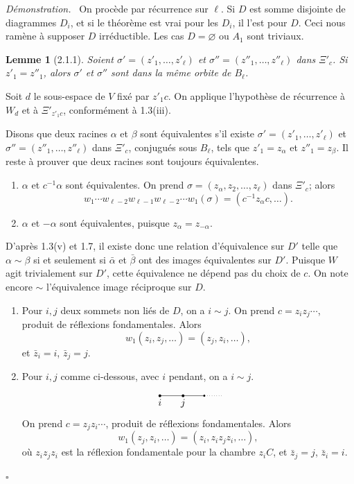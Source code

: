 \documentclass[11pt]{article}
\theoremstyle{plainfr}
\newtheorem*{lemme}{Lemme}
\newenvironment{preuve}{\par\emph{Démonstration.}\ }{\hfill$\square$\par}
\begin{document}
\begin{preuve}
On procède par récurrence sur $\ell$. Si $D$ est somme disjointe de diagrammes $D_i$, et si le théorème est vrai pour les $D_i$, il l'est pour $D$. Ceci nous ramène à supposer $D$ irréductible. Les cas $D=\varnothing$ ou $A_1$ sont triviaux.

\begin{lemme}[2.1.1]
Soient $\sigma'=(z'_1,\ldots,z'_\ell)$ et $\sigma''=(z''_1,\ldots,z''_\ell)$ dans $\Xi'_c$. Si $z'_1=z''_1$, alors $\sigma'$ et $\sigma''$ sont dans la même orbite de $B_\ell$.
\end{lemme}

Soit $d$ le sous-espace de $V$ fixé par $z'_1c$. On applique l'hypothèse de récurrence à $W_d$ et à $\Xi'_{z'_1c}$, conformément à 1.3(iii).

Disons que deux racines $\alpha$ et $\beta$ sont équivalentes s'il existe $\sigma'=(z'_1,\ldots,z'_\ell)$ et $\sigma''=(z''_1,\ldots,z''_\ell)$ dans $\Xi'_c$, conjugués sous $B_\ell$, tels que $z'_1=z_\alpha$ et $z''_1=z_\beta$. Il reste à prouver que deux racines sont toujours équivalentes.

\begin{enumerate}[label=(\alph*),leftmargin=2.2em]
\item $\alpha$ et $c^{-1}\alpha$ sont équivalentes. On prend $\sigma=(z_\alpha,z_2,\ldots,z_\ell)$ dans $\Xi'_c$; alors
\[
 w_1\cdots w_{\ell-2}w_{\ell-1}w_{\ell-2}\cdots w_1(\sigma)=(c^{-1}z_\alpha c,\ldots).
\]

\item $\alpha$ et $-\alpha$ sont équivalentes, puisque $z_\alpha=z_{-\alpha}$.
\end{enumerate}

D'après 1.3(v) et 1.7, il existe donc une relation d'équivalence sur $D'$ telle que $\alpha\sim\beta$ si et seulement si $\bar\alpha$ et $\bar\beta$ ont des images équivalentes sur $D'$. Puisque $W$ agit trivialement sur $D'$, cette équivalence ne dépend pas du choix de $c$. On note encore $\sim$ l'équivalence image réciproque sur $D$.

\begin{enumerate}[label=(\alph*),leftmargin=2.2em,start=3]
\item Pour $i,j$ deux sommets non liés de $D$, on a $i\sim j$. On prend $c=z_i z_j\cdots$, produit de réflexions fondamentales. Alors
\[
 w_1(z_i,z_j,\ldots)=(z_j,z_i,\ldots),
\]
et $\bar z_i=i$, $\bar z_j=j$.

\item Pour $i,j$ comme ci-dessous, avec $i$ pendant, on a $i\sim j$.
\[
\begin{tikzpicture}[baseline=-.5ex,scale=.7]
\draw (0,0)--(1.2,0)--(2.3,0);
\fill (0,0) circle (2pt) node[below]{$i$};
\fill (1.2,0) circle (2pt) node[below]{$j$};
\fill (2.3,0) circle (1.5pt);
\draw[dotted] (2.45,0)--(3.2,0);
\end{tikzpicture}
\]
On prend $c=z_jz_i\cdots$, produit de réflexions fondamentales. Alors
\[
 w_1(z_j,z_i,\ldots)=(z_i,z_i z_j z_i,\ldots),
\]
où $z_i z_j z_i$ est la réflexion fondamentale pour la chambre $z_iC$, et $\bar z_j=j$, $\bar z_i=i$.
\end{enumerate}


\end{preuve}
\end{document}
